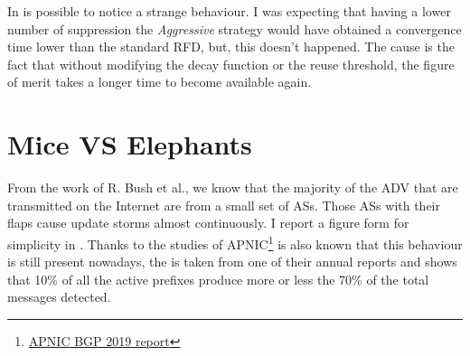 In  is possible to notice a strange behaviour.
I was expecting that having a lower number of suppression the \textit{Aggressive} strategy
would have obtained a convergence time lower than the standard \ac{RFD}, but,
this doesn't happened.
The cause is the fact that without modifying the decay function or the reuse
threshold, the figure of merit takes a longer time to become available again.

\section{Mice VS Elephants}
\label{sec:rfd_mice_vs_elephants}


From the work of R. Bush et al., \cite{pelsser2011route} we know that the majority
of the \ac{ADV} that are transmitted on the Internet are from a small set of \acp{AS}.
Those \acp{AS} with their flaps cause update storms almost continuously.
I report a figure form \cite{pelsser2011route} for simplicity in
.
Thanks to the studies of
\ac{APNIC}\footnote{\href{https://blog.apnic.net/2020/01/15/bgp-in-2019-bgp-churn/}{APNIC BGP 2019 report}}
is also known that this behaviour is still present nowadays, the 
is taken from one of their annual reports and shows that \num{10}\% of
all the active prefixes produce more or less the \num{70}\% of the total
messages detected.

